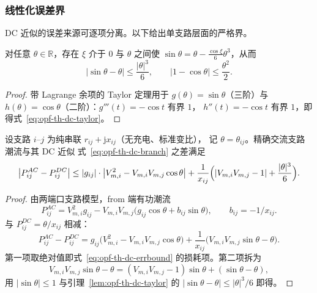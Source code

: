\subsubsection{线性化误差界}

DC 近似的误差来源可逐项分离。以下给出单支路层面的严格界。

\begin{lemma}\label{lem:opf-th-dc-taylor}
对任意 $\theta\in\mathbb R$，存在 $\xi$ 介于 $0$ 与 $\theta$ 之间使
$\sin\theta=\theta-\frac{\cos\xi}{6}\theta^3$，从而
\begin{equation}
|\sin\theta-\theta|\le\frac{|\theta|^3}{6},\qquad
|1-\cos\theta|\le\frac{\theta^2}{2}.
\label{eq:opf-th-dc-taylor}
\end{equation}
\end{lemma}

\begin{proof}
带 Lagrange 余项的 Taylor 定理用于 $g(\theta)=\sin\theta$（三阶）与
$h(\theta)=\cos\theta$（二阶）：$g'''(t)=-\cos t$ 有界 $1$，
$h''(t)=-\cos t$ 有界 $1$，即得式~\eqref{eq:opf-th-dc-taylor}。
\end{proof}

\begin{proposition}[支路潮流误差界]\label{prop:opf-th-dc-errbound}
设支路 $i$--$j$ 为纯串联 $r_{ij}+\mathrm jx_{ij}$（无充电、标准变比），
记 $\theta=\theta_{ij}$。精确交流支路潮流与其 DC 近似
式~\eqref{eq:opf-th-dc-branch} 之差满足
\begin{equation}
\bigl|P_{ij}^{AC}-P_{ij}^{DC}\bigr|
\le |g_{ij}|\cdot\bigl|V_{m,i}^2-V_{m,i}V_{m,j}\cos\theta\bigr|
+\frac{1}{x_{ij}}\Bigl(|V_{m,i}V_{m,j}-1|+\frac{|\theta|^3}{6}\Bigr).
\label{eq:opf-th-dc-errbound}
\end{equation}
\end{proposition}

\begin{proof}
由两端口支路模型，from 端有功潮流
\begin{equation}
P_{ij}^{AC}=V_{m,i}^2g_{ij}-V_{m,i}V_{m,j}
\bigl(g_{ij}\cos\theta+b_{ij}\sin\theta\bigr),\qquad b_{ij}=-1/x_{ij}.
\end{equation}
与 $P_{ij}^{DC}=\theta/x_{ij}$ 相减：
\begin{equation}
P_{ij}^{AC}-P_{ij}^{DC}
=g_{ij}\bigl(V_{m,i}^2-V_{m,i}V_{m,j}\cos\theta\bigr)
+\frac{1}{x_{ij}}\bigl(V_{m,i}V_{m,j}\sin\theta-\theta\bigr).
\end{equation}
第一项取绝对值即式~\eqref{eq:opf-th-dc-errbound} 的损耗项。第二项拆为
\begin{equation}
V_{m,i}V_{m,j}\sin\theta-\theta
=(V_{m,i}V_{m,j}-1)\sin\theta+(\sin\theta-\theta),
\end{equation}
用 $|\sin\theta|\le1$ 与引理~\ref{lem:opf-th-dc-taylor} 的
$|\sin\theta-\theta|\le|\theta|^3/6$ 即得。
\end{proof}

